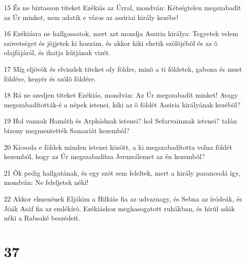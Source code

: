 \par 15 És ne biztasson titeket Ezékiás az Úrral, mondván: Kétségtelen megszabadít az Úr minket, nem adatik e város az assiriai király kezébe!
\par 16 Ezékiásra ne hallgassatok, mert azt mondja Assiria királya: Tegyetek velem szövetséget és jõjjetek ki hozzám, és akkor kiki ehetik szõlõjébõl és az õ olajfájáról, és ihatja kútjának vizét.
\par 17 Míg eljövök és elviszlek titeket oly földre, minõ a ti földetek, gabona és must földére, kenyér és szõlõ földére.
\par 18 Rá ne szedjen titeket Ezékiás, mondván: Az Úr megszabadít minket! Avagy megszabadították-é a népek istenei, kiki az õ földét Assiria királyának kezébõl?
\par 19 Hol vannak Hamáth és Arphádnak istenei? hol Sefarvaimnak istenei? talán bizony megmentették Samariát kezembõl?
\par 20 Kicsoda e földek minden istenei között, a ki megszabadította volna földét kezembõl, hogy az Úr megszabadítsa Jeruzsálemet az én kezembõl?
\par 21 Õk pedig hallgatának, és egy szót sem feleltek, mert a király parancsolá így, mondván: Ne feleljetek néki!
\par 22 Akkor elmenének Eljákim a Hilkiás fia az udvarnagy, és Sebna az íródeák, és Jóák Asáf fia az emlékíró, Ezékiáshoz meghasogatott ruhákban, és hírül adák néki a Rabsaké beszédeit.

\chapter{37}

